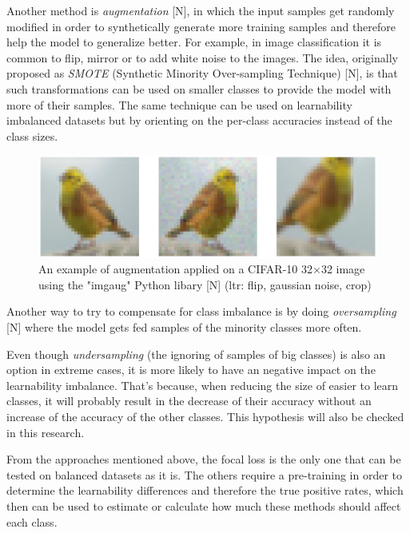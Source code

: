 \documentclass[journal]{IEEEtran}
\begin{document}
Another method is \emph{augmentation} [N], in which the input samples get randomly modified in order to synthetically generate more training samples and therefore help the model to generalize better. 
For example, in image classification it is common to flip, mirror or to add white noise to the images. 
The idea, originally proposed as \emph{SMOTE} (Synthetic Minority Over-sampling Technique) [N], is that such transformations can be used on smaller classes to provide the model with more of their samples.
The same technique can be used on learnability imbalanced datasets but by orienting on the per-class accuracies instead of the class sizes.

\begin{figure}[h!]
        \includegraphics[width=\linewidth]{images/augmentation3.png}
        \caption{An example of augmentation applied on a CIFAR-10 32$\times$32 image using the "imgaug" Python libary [N] (ltr: flip, gaussian noise, crop)}
        \label{fig:augmentation}
\end{figure}

Another way to try to compensate for class imbalance is by doing \emph{oversampling} [N] where the model gets fed samples of the minority classes more often.

Even though \emph{undersampling} (the ignoring of samples of big classes) is also an option in extreme cases, it is more likely to have an negative impact on the learnability imbalance.
That's because, when reducing the size of easier to learn classes, it will probably result in the decrease of their accuracy without an increase of the accuracy of the other classes.
This hypothesis will also be checked in this research.

From the approaches mentioned above, the focal loss is the only one that can be tested on balanced datasets as it is. 
The others require a pre-training in order to determine the learnability differences and therefore the true positive rates, which then can be used to estimate or calculate how much these methods should affect each class.
\end{document}
